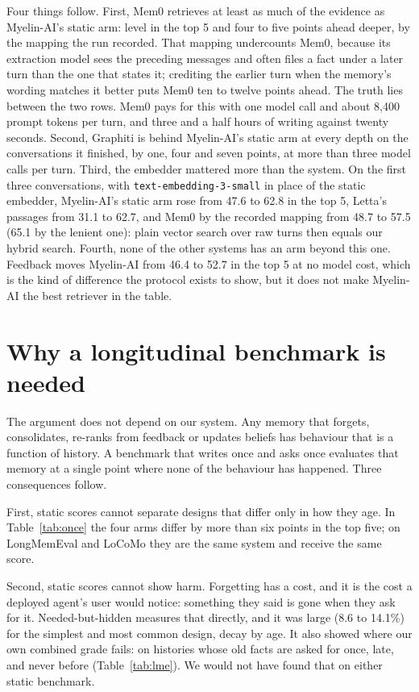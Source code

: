 \documentclass[11pt]{article}
\begin{document}
Four things follow. First, Mem0 retrieves at least as much of the
evidence as \mbox{Myelin-AI}'s static arm: level in the top 5 and four
to five points ahead deeper, by the mapping the run recorded. That
mapping undercounts Mem0, because its extraction model sees the
preceding messages and often files a fact under a later turn than the
one that states it; crediting the earlier turn when the memory's
wording matches it better puts Mem0 ten to twelve points ahead. The
truth lies between the two rows. Mem0 pays for this with one model
call and about 8{,}400 prompt tokens per turn, and three and a half
hours of writing against twenty seconds. Second, Graphiti is behind
\mbox{Myelin-AI}'s static arm at every depth on the conversations it
finished, by one, four and seven points, at more than three model
calls per turn. Third, the embedder mattered more than the system. On
the first three conversations, with \texttt{text-embedding-3-small} in
place of the static embedder, \mbox{Myelin-AI}'s static arm rose from
47.6 to 62.8 in the top 5, Letta's passages from 31.1 to 62.7, and
Mem0 by the recorded mapping from 48.7 to 57.5 (65.1 by the lenient
one): plain vector search over raw turns then equals our hybrid
search. Fourth, none of the other systems has an arm beyond this one.
Feedback moves \mbox{Myelin-AI} from 46.4 to 52.7 in the top 5 at no
model cost, which is the kind of difference the protocol exists to
show, but it does not make \mbox{Myelin-AI} the best retriever in the
table.

\section{Why a longitudinal benchmark is needed}

The argument does not depend on our system. Any memory that forgets,
consolidates, re-ranks from feedback or updates beliefs has behaviour
that is a function of history. A benchmark that writes once and asks
once evaluates that memory at a single point where none of the
behaviour has happened. Three consequences follow.

First, static scores cannot separate designs that differ only in how
they age. In Table~\ref{tab:once} the four arms differ by more than six
points in the top five; on LongMemEval and LoCoMo they are the same
system and receive the same score.

Second, static scores cannot show harm. Forgetting has a cost, and it
is the cost a deployed agent's user would notice: something they said
is gone when they ask for it. Needed-but-hidden measures that directly,
and it was large (8.6 to 14.1\%) for the simplest and most common
design, decay by age. It also showed where our own combined grade
fails: on histories whose old facts are asked for once, late, and
never before (Table~\ref{tab:lme}). We would not have found that on
either static benchmark.
\end{document}
